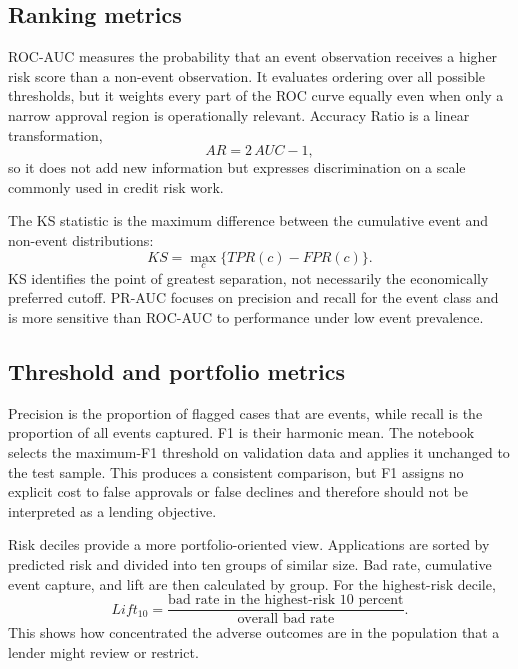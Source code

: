 \documentclass[11pt]{article}
\begin{document}
\subsection{Ranking metrics}
ROC-AUC measures the probability that an event observation receives a higher risk score than a non-event observation. It evaluates ordering over all possible thresholds, but it weights every part of the ROC curve equally even when only a narrow approval region is operationally relevant. Accuracy Ratio is a linear transformation,
\begin{equation}
AR=2\,AUC-1,
\end{equation}
so it does not add new information but expresses discrimination on a scale commonly used in credit risk work.

The KS statistic is the maximum difference between the cumulative event and non-event distributions:
\begin{equation}
KS=\max_c\{TPR(c)-FPR(c)\}.
\end{equation}
KS identifies the point of greatest separation, not necessarily the economically preferred cutoff. PR-AUC focuses on precision and recall for the event class and is more sensitive than ROC-AUC to performance under low event prevalence.

\subsection{Threshold and portfolio metrics}
Precision is the proportion of flagged cases that are events, while recall is the proportion of all events captured. F1 is their harmonic mean. The notebook selects the maximum-F1 threshold on validation data and applies it unchanged to the test sample. This produces a consistent comparison, but F1 assigns no explicit cost to false approvals or false declines and therefore should not be interpreted as a lending objective.

Risk deciles provide a more portfolio-oriented view. Applications are sorted by predicted risk and divided into ten groups of similar size. Bad rate, cumulative event capture, and lift are then calculated by group. For the highest-risk decile,
\begin{equation}
Lift_{10}=\frac{\text{bad rate in the highest-risk 10 percent}}{\text{overall bad rate}}.
\end{equation}
This shows how concentrated the adverse outcomes are in the population that a lender might review or restrict.
\end{document}
